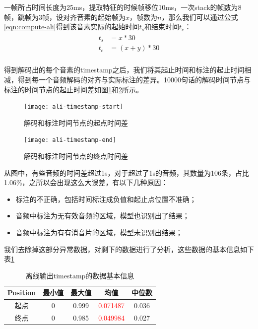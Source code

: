 一帧所占时间长度为25ms，提取特征的时候帧移位10ms，一次stack的帧数为8帧，跳帧为3帧，设对齐音素的起始帧为$x$，帧数为$n$，那么我们可以通过公式\ref{eqn:compute-ali}得到该音素实际的起始时间$t_{s}$和结束时间$t_{e}$：
\begin{align}
\begin{split}
\label{eqn:compute-ali}
	t_{s} &= x*30 \\
	t_{e} &= (x+y)*30 \\
\end{split}
\end{align}

得到解码出的每个音素的timestamp之后，我们将其起止时间和标注的起止时间相减，得到每一个音频解码的对齐与实际标注的差异。10000句话的解码时间节点与标注的时间节点的起止时间差如图\ref{fig:ali-sta}和\ref{fig:ali-end}所示。
\begin{figure}[!ht]
	\centering
	\texttt{[image: ali-timestamp-start]}
	\caption{解码和标注时间节点的起点时间差}
\label{fig:ali-sta}
\end{figure}

\begin{figure}[!ht]
	\centering
	\texttt{[image: ali-timestamp-end]}
	\caption{解码和标注时间节点的终点时间差}
\label{fig:ali-end}
\end{figure}

从图中，有些音频的时间差超过1s，对于超过了1s的音频，其数量为106条，占比1.06\%，之所以会出现这么大误差，有以下几种原因：
\begin{itemize}
	\item 标注的不正确，包括时间标注成负值和起止点位置不准确；
	\item 音频中标注为无有效音频的区域，模型也识别出了结果；
	\item 音频中标注为有有消音片的区域，模型未识别出结果；
\end{itemize}

我们去除掉这部分异常数据，对剩下的数据进行了分析，这些数据的基本信息如下表\ref{tab:basic-info}
\begin{table}[h]
 \centering
 \caption{离线输出timestamp的数据基本信息}
	 \begin{tabular*}{1\textwidth}{@{\extracolsep{\fill}}ccccc}
	 \toprule
		{\bf Position} & {\bf 最小值} &{\bf 最大值} &{\bf 均值}  &{\bf 中位数} \\
	 \midrule
	   起点    &    0  &   0.999   &  \textcolor{red}{0.071487}   &   0.036   \\
	   终点    &    0  &   0.985   &  \textcolor{red}{0.049984}   &   0.027   \\
	 \bottomrule
	 \end{tabular*}%
 \label{tab:basic-info}%
\end{table}%
   

